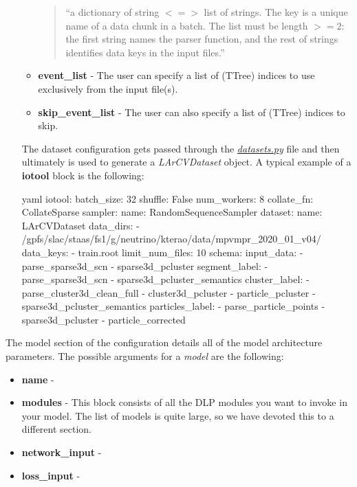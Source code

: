 \documentclass[8pt]{refart}
\begin{document}
\begin{itemize}
\begin{itemize}
        \begin{quotation}
            ``a dictionary of string $<=>$ list of strings. The key is a unique name of a data chunk in a batch.
              The list must be length $>= 2$: the first string names the parser function, and the rest of strings
              identifies data keys in the input files.''
        \end{quotation}
        \item \textbf{event\_list} - The user can specify a list of (TTree) indices to use exclusively from the input file(s).
        \item \textbf{skip\_event\_list} - The user can also specify a list of (TTree) indices to skip.
    \end{itemize}
    The dataset configuration gets passed through the \href{https://github.com/DeepLearnPhysics/lartpc_mlreco3d/blob/develop/mlreco/iotools/datasets.py}{\textit{datasets.py}} file and then ultimately is used to generate a \textit{LArCVDataset} object.  A typical example of a \textbf{iotool} block is the following:
    \begin{code}{yaml}
    iotool:
    batch_size: 32
    shuffle: False
    num_workers: 8
    collate_fn: CollateSparse
    sampler:
      name: RandomSequenceSampler
    dataset:
      name: LArCVDataset
      data_dirs:
        - /gpfs/slac/staas/fs1/g/neutrino/kterao/data/mpvmpr_2020_01_v04/
      data_keys:
        - train.root
      limit_num_files: 10
      schema:
        input_data:
          - parse_sparse3d_scn
          - sparse3d_pcluster
        segment_label:
          - parse_sparse3d_scn
          - sparse3d_pcluster_semantics
        cluster_label:
          - parse_cluster3d_clean_full
          - cluster3d_pcluster
          - particle_pcluster
          - sparse3d_pcluster_semantics
        particles_label:
          - parse_particle_points
          - sparse3d_pcluster
          - particle_corrected
    \end{code}
\end{itemize}

The model section of the configuration details all of the model architecture parameters.  The possible arguments for a \textit{model} are the following:
\begin{itemize}
    \item \textbf{name} - 
    \item \textbf{modules} - This block consists of all the DLP modules you want to invoke in your model.  The list of models is quite large, so we have devoted this to a different section.
    \item \textbf{network\_input} - 
    \item \textbf{loss\_input} - 
\end{itemize}
\end{document}
